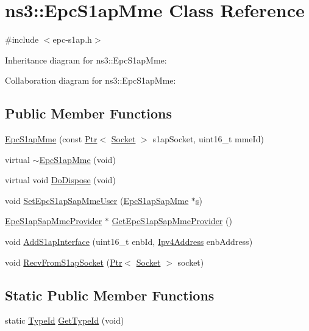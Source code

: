 \hypertarget{classns3_1_1EpcS1apMme}{}\section{ns3\+:\+:Epc\+S1ap\+Mme Class Reference}
\label{classns3_1_1EpcS1apMme}


{\ttfamily \#include $<$epc-\/s1ap.\+h$>$}



Inheritance diagram for ns3\+:\+:Epc\+S1ap\+Mme\+:


Collaboration diagram for ns3\+:\+:Epc\+S1ap\+Mme\+:
\subsection*{Public Member Functions}
\begin{DoxyCompactItemize}
\item 
\hyperlink{classns3_1_1EpcS1apMme_aad79a5064c731d37eb48037d4d66fe13}{Epc\+S1ap\+Mme} (const \hyperlink{classns3_1_1Ptr}{Ptr}$<$ \hyperlink{classns3_1_1Socket}{Socket} $>$ s1ap\+Socket, uint16\+\_\+t mme\+Id)
\item 
virtual \hyperlink{classns3_1_1EpcS1apMme_ad6fe849389b6a1bd22c73cf1e41f3122}{$\sim$\+Epc\+S1ap\+Mme} (void)
\item 
virtual void \hyperlink{classns3_1_1EpcS1apMme_a63415f8d8029ca36716845ce878dc9d1}{Do\+Dispose} (void)
\item 
void \hyperlink{classns3_1_1EpcS1apMme_ada102d3d64e1d8cd743481b312d91120}{Set\+Epc\+S1ap\+Sap\+Mme\+User} (\hyperlink{classns3_1_1EpcS1apSapMme}{Epc\+S1ap\+Sap\+Mme} $\ast$\hyperlink{generate__test__data__lte__sinr_8m_ad83eeb3a142285d1243a08c6b7026df8}{s})
\item 
\hyperlink{classns3_1_1EpcS1apSapMmeProvider}{Epc\+S1ap\+Sap\+Mme\+Provider} $\ast$ \hyperlink{classns3_1_1EpcS1apMme_ac5b8c11882d4a4d2d365a716f007efbf}{Get\+Epc\+S1ap\+Sap\+Mme\+Provider} ()
\item 
void \hyperlink{classns3_1_1EpcS1apMme_acc324df9146b82911825b748fde9f938}{Add\+S1ap\+Interface} (uint16\+\_\+t enb\+Id, \hyperlink{classns3_1_1Ipv4Address}{Ipv4\+Address} enb\+Address)
\item 
void \hyperlink{classns3_1_1EpcS1apMme_a453fdb57c550f0bbbf11a32658497d25}{Recv\+From\+S1ap\+Socket} (\hyperlink{classns3_1_1Ptr}{Ptr}$<$ \hyperlink{classns3_1_1Socket}{Socket} $>$ socket)
\end{DoxyCompactItemize}
\subsection*{Static Public Member Functions}
\begin{DoxyCompactItemize}
\item 
static \hyperlink{classns3_1_1TypeId}{Type\+Id} \hyperlink{classns3_1_1EpcS1apMme_a3c9f162baab0da49af6c4ff18d83aa84}{Get\+Type\+Id} (void)
\end{DoxyCompactItemize}
